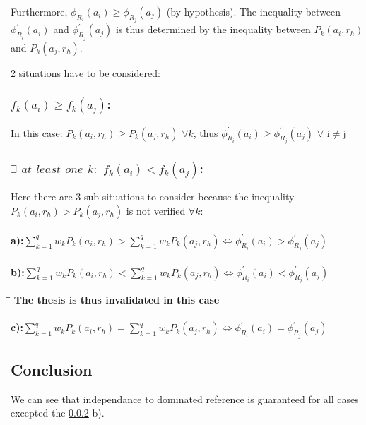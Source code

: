 \documentclass{article}
\begin{document}
Furthermore, $\phi_{R_i}(a_i)\geq\phi_{R_j}(a_j)$ (by hypothesis). The inequality between $\phi_{R_i}^{'}(a_i)$ and $\phi_{R_j}^{'}(a_j)$ is thus determined by the inequality between $P_k(a_i,r_h)$ and $P_k(a_j,r_h)$.\linebreak

2 situations have to be considered:

\subsubsection{$f_k(a_i)\geq f_k(a_j)$:}
In this case: $P_k(a_i,r_h) \geq P_k(a_j,r_h)$  $\forall k$, thus $\phi_{R_i}^{'}(a_i)\geq\phi_{R_j}^{'}(a_j)$ $\forall$ i$\neq$j

\subsubsection{$\exists$ $at$ $least$ $one$ $k :$ $f_k(a_i) < f_k(a_j)$:}
\label{2esituation}
Here there are 3 sub-situations to consider because the inequality $P_k(a_i,r_h)>P_k(a_j,r_h)$ is not verified $\forall k$:

\paragraph{}
\textbf{a):}$\sum\limits_{k=1}^q w_k P_k(a_i,r_h)>\sum\limits_{k=1}^q w_k P_k(a_j,r_h) \iff \phi_{R_i}^{'}(a_i)>\phi_{R_j}^{'}(a_j)$

\paragraph{}
\textbf{b):}$\sum\limits_{k=1}^q w_k P_k(a_i,r_h)<\sum\limits_{k=1}^q w_k P_k(a_j,r_h) \iff \phi_{R_i}^{'}(a_i)<\phi_{R_j}^{'}(a_j)$\linebreak
\begin{tabbing}
\hspace{2cm}\=\hspace{2cm}\=\kill
\> \textbf{The thesis is thus invalidated in this case}
\end{tabbing}


\paragraph{}
\textbf{c):}$\sum\limits_{k=1}^q w_k P_k(a_i,r_h)=\sum\limits_{k=1}^q w_k P_k(a_j,r_h) \iff \phi_{R_i}^{'}(a_i)=\phi_{R_j}^{'}(a_j)$\\

\subsection{Conclusion}
We can see that independance to dominated reference is guaranteed for all cases excepted the \ref{2esituation} b).
\end{document}
